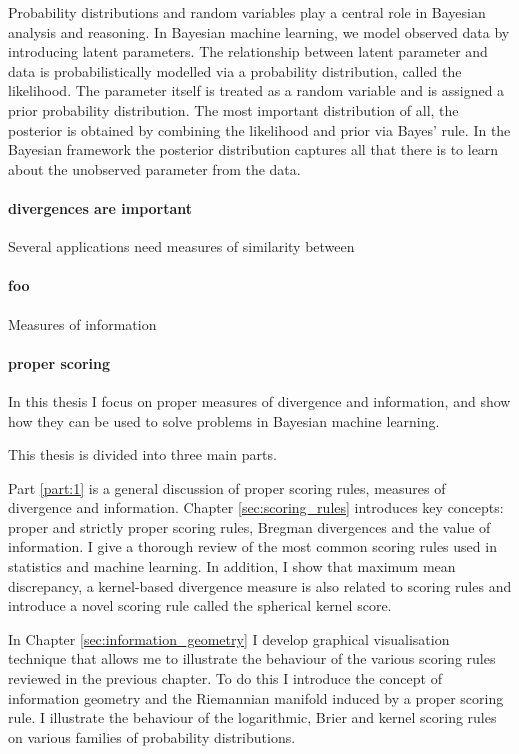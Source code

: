 
Probability distributions and random variables play a central role in Bayesian analysis and reasoning. In Bayesian machine learning, we model observed data by introducing latent parameters. The relationship between latent parameter and data is probabilistically modelled via a probability distribution, called the likelihood. The parameter itself is treated as a random variable and is assigned a prior probability distribution.
The most important distribution of all, the posterior is obtained by combining the likelihood and prior via Bayes' rule. In the Bayesian framework the posterior distribution captures all that there is to learn about the unobserved parameter from the data.

\paragraph{divergences are important} \lipsum[1]Several applications need measures of similarity between

\paragraph{foo}Measures of information \lipsum[1]

\paragraph{proper scoring} In this thesis I focus on proper measures of divergence and information, and show how they can be used to solve problems in Bayesian machine learning. \lipsum[1]

This thesis is divided into three main parts.

Part \ref{part:1} is a general discussion of proper scoring rules, measures of divergence and information. Chapter \ref{sec:scoring_rules} introduces key concepts: proper and strictly proper scoring rules, Bregman divergences and the value of information. I give a thorough review of the most common scoring rules used in statistics and machine learning. In addition, I show that maximum mean discrepancy, a kernel-based divergence measure is also related to scoring rules and introduce a novel scoring rule called the spherical kernel score.

In Chapter \ref{sec:information_geometry} I develop graphical visualisation technique that allows me to illustrate the behaviour of the various scoring rules reviewed in the previous chapter. To do this I introduce the concept of information geometry and the Riemannian manifold induced by a proper scoring rule. I illustrate the behaviour of the logarithmic, Brier and kernel scoring rules on various families of probability distributions.

